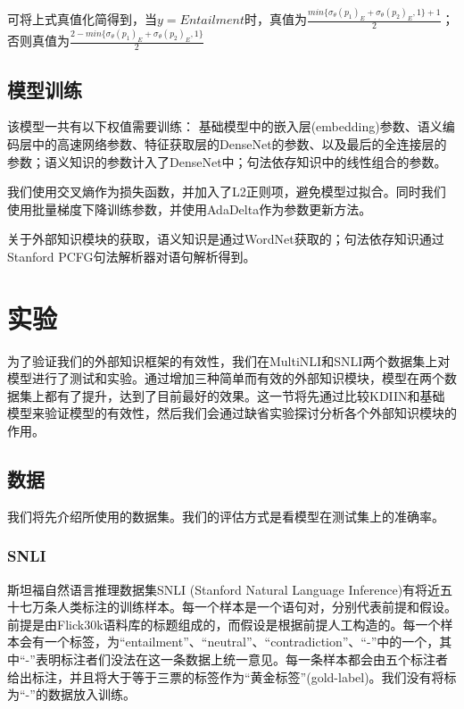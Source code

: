 \documentclass[UTF8,11pt,a4paper,nofonts]{ctexart}
\begin{document}
可将上式真值化简得到，当$y=Entailment$时，真值为$\frac{min\{\sigma_\theta(p_1)_E+\sigma_\theta(p_2)_E,1\}+1}{2}$；否则真值为$\frac{2-min\{\sigma_\theta(p_1)_E+\sigma_\theta(p_2)_E,1\}}{2}$

\subsection{模型训练}


该模型一共有以下权值需要训练：
基础模型中的嵌入层(embedding)参数、语义编码层中的高速网络参数、特征获取层的DenseNet的参数、以及最后的全连接层的参数；语义知识的参数计入了DenseNet中；句法依存知识中的线性组合的参数。

我们使用交叉熵作为损失函数，并加入了L2正则项，避免模型过拟合。同时我们使用批量梯度下降训练参数，并使用AdaDelta\cite{Zeiler2012ADADELTAAA}作为参数更新方法。

关于外部知识模块的获取，语义知识是通过WordNet获取的；句法依存知识通过Stanford PCFG句法解析器对语句解析得到。



\section{实验}
为了验证我们的外部知识框架的有效性，我们在MultiNLI和SNLI两个数据集上对模型进行了测试和实验。通过增加三种简单而有效的外部知识模块，模型在两个数据集上都有了提升，达到了目前最好的效果。这一节将先通过比较KDIIN和基础模型来验证模型的有效性，然后我们会通过缺省实验探讨分析各个外部知识模块的作用。

\subsection{数据}
我们将先介绍所使用的数据集。我们的评估方式是看模型在测试集上的准确率。

\subsubsection{SNLI} 斯坦福自然语言推理数据集SNLI (Stanford Natural Language Inference)\cite{Bowman2015ALA}有将近五十七万条人类标注的训练样本。每一个样本是一个语句对，分别代表前提和假设。前提是由Flick30k语料库的标题组成的，而假设是根据前提人工构造的。每一个样本会有一个标签，为“entailment”、“neutral”、“contradiction”、“-”中的一个，其中“-”表明标注者们没法在这一条数据上统一意见。每一条样本都会由五个标注者给出标注，并且将大于等于三票的标签作为“黄金标签”(gold-label)。我们没有将标为“-”的数据放入训练。
\end{document}
